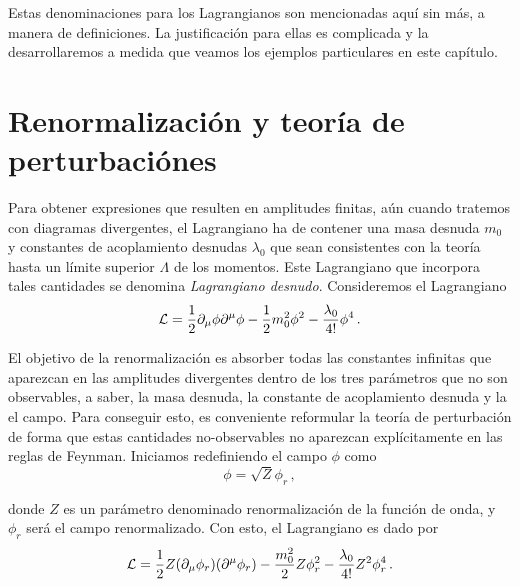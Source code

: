 Estas denominaciones para los Lagrangianos son mencionadas aquí sin más, a manera de definiciones. La justificación para ellas es complicada y la desarrollaremos a medida que veamos los ejemplos particulares en este capítulo.
\vspace{1cm}




\section{Renormalización y teoría de perturbaciónes}

Para obtener expresiones que resulten en amplitudes finitas, aún cuando tratemos con diagramas divergentes, el Lagrangiano ha de contener una masa desnuda $m_0$ y constantes de acoplamiento desnudas $\lambda_0$ que sean consistentes con la teoría hasta un límite superior $\Lambda$ de los momentos. Este Lagrangiano que incorpora tales cantidades se denomina \emph{Lagrangiano desnudo}. Consideremos el Lagrangiano
%
\begin{equation}
	\mathcal{L} = \frac{1}{2} \partial_\mu\phi \partial^\mu\phi - \frac{1}{2}m_0^2 \phi^2 - \frac{\lambda_0}{4!} \phi^4 \,.
\end{equation}

El objetivo de la renormalización es absorber todas las constantes infinitas que aparezcan en las amplitudes divergentes dentro de los tres parámetros que no son observables, a saber, la masa desnuda, la constante de acoplamiento desnuda y la el campo. Para conseguir esto, es conveniente reformular la teoría de perturbación de forma que estas cantidades no-observables no aparezcan explícitamente en las reglas de Feynman. Iniciamos redefiniendo el campo $\phi$ como
%
\begin{equation}
	\phi = \sqrt{Z} \phi_r \,,    
\end{equation}

\noindent donde $Z$ es un parámetro denominado renormalización de la función de onda, y $\phi_r$ será el campo renormalizado. Con esto, el Lagrangiano es dado por
%
\begin{equation}
	\mathcal{L} = \frac{1}{2} Z \qty(\partial_\mu\phi_r)\qty(\partial^\mu\phi_r)  - \frac{m_0^2}{2} Z \phi_r^2 - \frac{\lambda_0}{4!} Z^2 \phi_r^4\,.
\end{equation}


